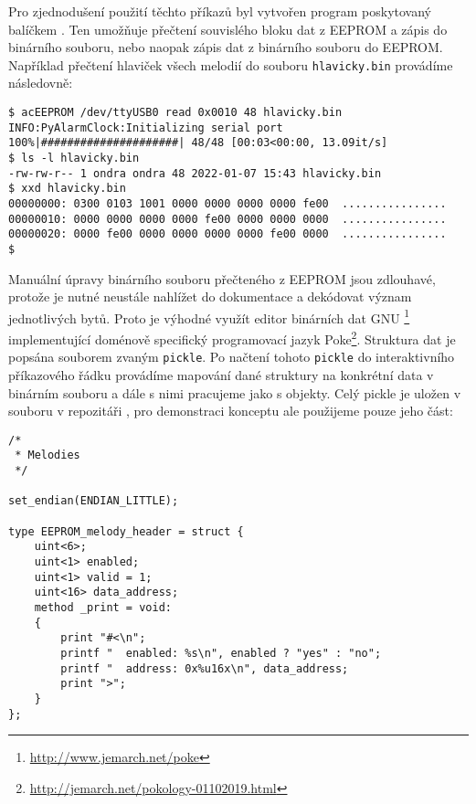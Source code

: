Pro zjednodušení použití těchto příkazů byl vytvořen program
 poskytovaný balíčkem . Ten umožňuje
přečtení souvislého bloku dat z EEPROM a zápis do binárního souboru, nebo
naopak zápis dat z binárního souboru do EEPROM. Například přečtení hlaviček
všech melodií do souboru \texttt{hlavicky.bin} provádíme následovně:
\begin{lstlisting}[style=terminal]
$ acEEPROM /dev/ttyUSB0 read 0x0010 48 hlavicky.bin
INFO:PyAlarmClock:Initializing serial port
100%|#####################| 48/48 [00:03<00:00, 13.09it/s]
$ ls -l hlavicky.bin
-rw-rw-r-- 1 ondra ondra 48 2022-01-07 15:43 hlavicky.bin
$ xxd hlavicky.bin
00000000: 0300 0103 1001 0000 0000 0000 0000 fe00  ................
00000010: 0000 0000 0000 0000 fe00 0000 0000 0000  ................
00000020: 0000 fe00 0000 0000 0000 0000 fe00 0000  ................
$
\end{lstlisting}

Manuální úpravy binárního souboru přečteného z EEPROM jsou zdlouhavé, protože
je nutné neustále nahlížet do dokumentace a dekódovat význam jednotlivých bytů.
Proto je výhodné využít editor binárních dat GNU
\footnote{\url{http://www.jemarch.net/poke}} implementující
doménově specifický programovací jazyk
Poke\footnote{\url{http://jemarch.net/pokology-01102019.html}}.
Struktura dat je popsána souborem zvaným \texttt{pickle}. Po načtení tohoto
\texttt{pickle} do interaktivního příkazového řádku  provádíme
mapování dané struktury na konkrétní data v binárním souboru a dále s nimi
pracujeme jako s objekty. Celý pickle je uložen v souboru
 v repozitáři , pro
demonstraci konceptu ale použijeme pouze jeho část:
\begin{lstlisting}[language=Poke]
/*
 * Melodies
 */

set_endian(ENDIAN_LITTLE);

type EEPROM_melody_header = struct {
    uint<6>;
    uint<1> enabled;
    uint<1> valid = 1;
    uint<16> data_address;
    method _print = void:
    {
        print "#<\n";
        printf "  enabled: %s\n", enabled ? "yes" : "no";
        printf "  address: 0x%u16x\n", data_address;
        print ">";
    }
};
\end{lstlisting}

